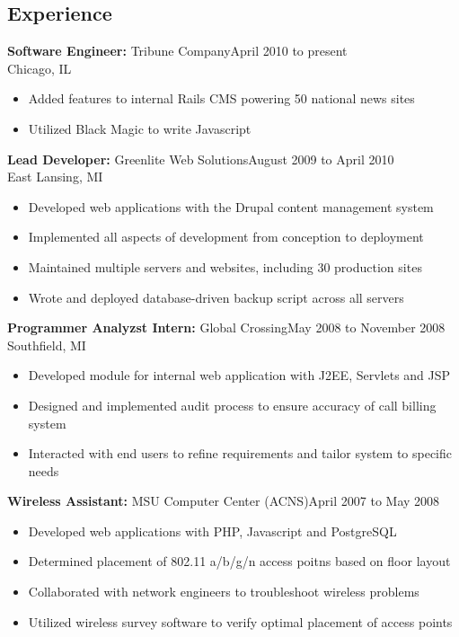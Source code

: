 \documentclass[]{res}
\begin{document}


\begin{resume}


\section{Experience}
{\bf Software Engineer:} Tribune Company\dotfill April 2010 to present\\
Chicago, IL
\begin{itemize}
\item Added features to internal Rails CMS powering 50 national news sites
\item Utilized Black Magic to write Javascript
\end{itemize}

{\bf Lead Developer:} Greenlite Web Solutions\dotfill August 2009 to April 2010\\
East Lansing, MI
\begin{itemize}
\item Developed web applications with the Drupal content management system
\item Implemented all aspects of development from conception to deployment
\item Maintained multiple servers and websites, including 30 production sites
\item Wrote and deployed database-driven backup script across all servers
\end{itemize}

{\bf Programmer Analyzst Intern:} Global Crossing\dotfill May 2008 to November 2008\\
Southfield, MI
\begin{itemize}
\item Developed module for internal web application with J2EE, Servlets and JSP
\item Designed and implemented audit process to ensure accuracy of call billing system
\item Interacted with end users to refine requirements and tailor system to specific needs
\end{itemize}

{\bf Wireless Assistant:} MSU Computer Center (ACNS)\dotfill April 2007 to May 2008
\begin{itemize}
\item Developed web applications with PHP, Javascript and PostgreSQL
\item Determined placement of 802.11 a/b/g/n access poitns based on floor layout
\item Collaborated with network engineers to troubleshoot wireless problems
\item Utilized wireless survey software to verify optimal placement of access points
\end{itemize}



\end{resume}
\end{document}
